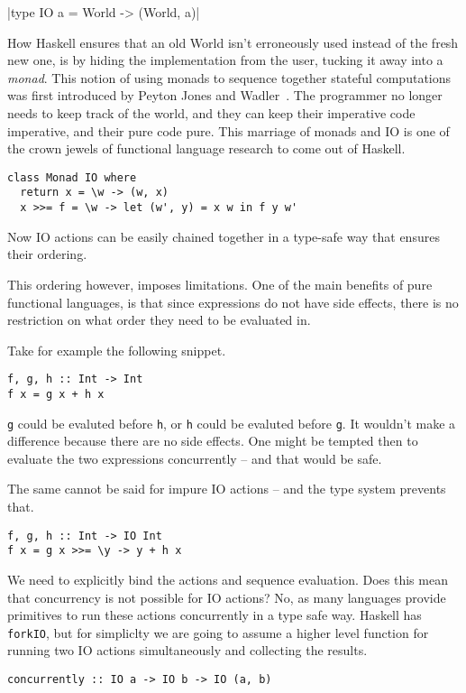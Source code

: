 \documentclass{report}
\begin{document}
|type IO a = World -> (World, a)|

How Haskell ensures that an old World isn't erroneously used instead of the
fresh new one, is by hiding the implementation from the user, tucking it away
into a \textit{monad}. This notion of using monads to sequence together stateful
computations was first introduced by Peyton Jones and
Wadler~\cite{peytonjones1993}\cite{wadler1995}. The programmer no longer needs
to keep track of the world, and they can keep their imperative code imperative,
and their pure code pure. This marriage of monads and IO is one of the crown
jewels of functional language research to come out of Haskell.
\begin{verbatim}
class Monad IO where
  return x = \w -> (w, x)
  x >>= f = \w -> let (w', y) = x w in f y w'
\end{verbatim}

Now IO actions can be easily chained together in a type-safe way that ensures
their ordering.

This ordering however, imposes limitations. One of the main benefits of pure
functional languages, is that since expressions do not have side effects, there
is no restriction on what order they need to be evaluated in.

Take for example the following snippet.
\begin{verbatim}
f, g, h :: Int -> Int
f x = g x + h x
\end{verbatim}

\texttt{g} could be evaluted before \texttt{h}, or \texttt{h} could
be evaluted before \texttt{g}. It wouldn't make a difference because there
are no side effects. One might be tempted then to evaluate the two expressions
concurrently -- and that would be safe.

The same cannot be said for impure IO actions -- and the type system prevents that.
\begin{verbatim}
f, g, h :: Int -> IO Int
f x = g x >>= \y -> y + h x
\end{verbatim}
We need to explicitly bind the actions and sequence evaluation.
Does this mean that concurrency is not possible for IO actions? No, as many
languages provide primitives to run these actions concurrently in a type safe
way. Haskell has \texttt{forkIO}, but for simpliclty we are going
to assume a higher level function for running two IO actions simultaneously and
collecting the results.

\begin{verbatim}
concurrently :: IO a -> IO b -> IO (a, b)
\end{verbatim}
\end{document}

